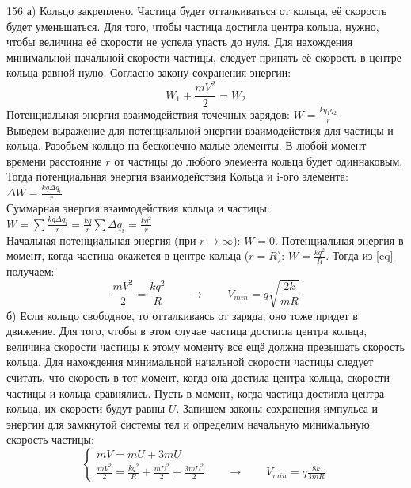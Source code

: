 \begin{Solution}{156}
а) Кольцо закреплено. Частица будет отталкиваться от кольца, её скорость будет уменьшаться. Для того, чтобы частица достигла центра кольца, нужно, чтобы величина её скорости не успела упасть до нуля. Для нахождения минимальной начальной скорости частицы, следует принять её скорость в центре кольца равной нулю. Согласно закону сохранения энергии:
\begin{equation}\label{eq}
W_1 + \frac{m V^2}{2} = W_2
\end{equation}
Потенциальная энергия взаимодействия точечных зарядов: $W = \frac{k q_1 q_2}{r}$ \\
Выведем выражение для потенциальной энергии взаимодействия для частицы и кольца. Разобьем кольцо на бесконечно малые элементы. В любой момент времени расстояние $r$ от частицы до любого элемента кольца будет одиннаковым. Тогда потенциальная энергия взаимодействия Кольца и i-ого элемента: $\Delta W = \frac{k q \Delta q_i}{r}$ \\
Суммарная энергия взаимодействия кольца и частицы: $W = \sum \frac{k q \Delta q_i}{r} = \frac{k q}{r} \sum \Delta q_i = \frac{k q^2}{r}$ \\
Начальная потенциальная энергия (при $r \rightarrow \infty$): $W = 0$. Потенциальная энергия в момент, когда частица окажется в центре кольца ($r = R$): $W = \frac{k q^2}{R}$. Тогда из \ref{eq} получаем:
\begin{equation*}
\frac{m V^2}{2} = \frac{k q^2}{R} \qquad \rightarrow \qquad V_{min} = q \sqrt{\frac{2 k}{m R}}
\end{equation*}
б) Если кольцо свободное, то отталкиваясь от заряда, оно тоже придет в движение. Для того, чтобы в этом случае частица достигла центра кольца, величина скорости частицы к этому моменту все ещё должна превышать скорость кольца. Для нахождения минимальной начальной скорости частицы следует считать, что скорость в тот момент, когда она достила центра кольца, скорости частицы и кольца сравнялись. Пусть в момент, когда частица достигла центра кольца, их скорости будут равны $U$. Запишем законы сохранения импульса и энергии для замкнутой системы тел и определим начальную минимальную скорость частицы:
\begin{equation*}
\begin{cases}
mV = m U + 3 m U \\
\frac{m V^2}{2} = \frac{k q^2}{R} + \frac{m U^2}{2} + \frac{3 m U^2}{2} \qquad \rightarrow \qquad V_{min} = q \frac{8 k}{3 m R}
\end{cases}
\end{equation*}
\end{Solution}
